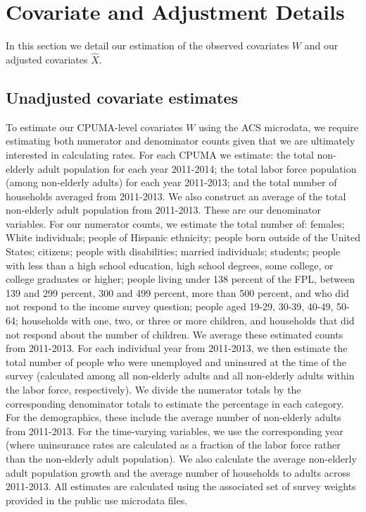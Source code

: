 \section{Covariate and Adjustment Details}\label{app:adjustmentdetails}

In this section we detail our estimation of the observed covariates $W$ and our adjusted covariates $\hat{X}$. 

\subsection{Unadjusted covariate estimates}

To estimate our CPUMA-level covariates $W$ using the ACS microdata, we require estimating both numerator and denominator counts given that we are ultimately interested in calculating rates. For each CPUMA we estimate: the total non-elderly adult population for each year 2011-2014; the total labor force population (among non-elderly adults) for each year 2011-2013; and the total number of households averaged from 2011-2013. We also construct an average of the total non-elderly adult population from 2011-2013. These are our denominator variables. For our numerator counts, we estimate the total number of: females; White individuals; people of Hispanic ethnicity; people born outside of the United States; citizens; people with disabilities; married individuals; students; people with less than a high school education, high school degrees, some college, or college graduates or higher; people living under 138 percent of the FPL, between 139 and 299 percent, 300 and 499 percent, more than 500 percent, and who did not respond to the income survey question; people aged 19-29, 30-39, 40-49, 50-64; households with one, two, or three or more children, and households that did not respond about the number of children. We average these estimated counts from 2011-2013. For each individual year from 2011-2013, we then estimate the total number of people who were unemployed and uninsured at the time of the survey (calculated among all non-elderly adults and all non-elderly adults within the labor force, respectively). We divide the numerator totals by the corresponding denominator totals to estimate the percentage in each category. For the demographics, these include the average number of non-elderly adults from 2011-2013. For the time-varying variables, we use the corresponding year (where uninsurance rates are calculated as a fraction of the labor force rather than the non-elderly adult population). We also calculate the average non-elderly adult population growth and the average number of households to adults across 2011-2013. All estimates are calculated using the associated set of survey weights provided in the public use microdata files.

